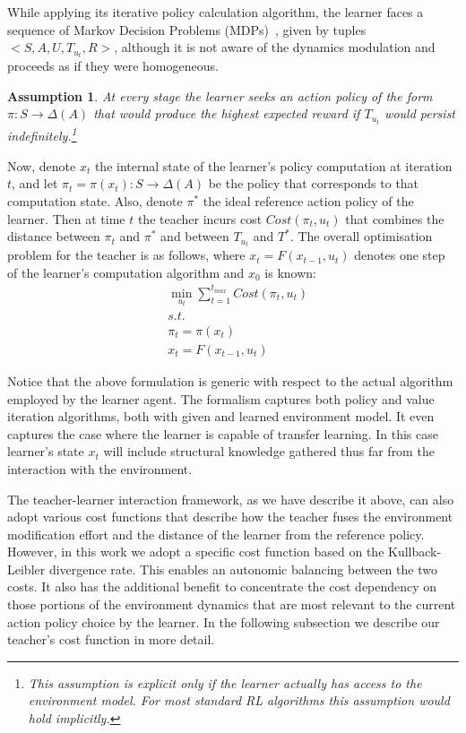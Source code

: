 \documentclass[letterpaper]{aamas2010}
\newtheorem{assume}{{\bf Assumption}}
\begin{document}
While applying its iterative policy calculation algorithm, the learner
faces a sequence of Markov Decision Problems (MDPs)~\cite{puterman_book_94},
 given by tuples $<S,A,U,T_{u_t},R>$, although it is not aware of the dynamics
modulation and proceeds as if they were homogeneous. 
\begin{assume}\label{assume_persistence}
At every
stage the learner seeks an action policy of the form
$\pi:S\rightarrow\Delta(A)$ that would produce the highest expected
reward if $T_{u_t}$ would persist indefinitely.\footnote{This 
  assumption is explicit only if the learner actually has access to
  the environment model. For most standard RL algorithms this
  assumption would hold implicitly.}
\end{assume}

Now, denote $x_t$ the internal state of the learner's policy
computation at iteration $t$, and let
$\pi_t=\pi(x_t):S\rightarrow\Delta(A)$ be the policy that corresponds
to that computation state. Also, denote $\pi^*$ the ideal reference
action policy of the learner. Then at time $t$ the teacher incurs cost
$Cost(\pi_t,u_t)$ that combines the distance between $\pi_t$ and
$\pi^*$ and between $T_{u_t}$ and $T^*$. The overall optimisation
problem for the teacher is as follows, where $x_t=F(x_{t-1},u_t)$
denotes one step of the learner's computation algorithm and $x_0$ is
known:
\begin{eqnarray*}
&\min\limits_{u_t}\sum\limits_{t=1}^{t_{max}}Cost(\pi_t,u_t)\\
&s.t.\\
&\pi_t=\pi(x_t)\\
&x_t=F(x_{t-1},u_t)
\end{eqnarray*}

Notice that the above formulation is generic with respect to the
actual algorithm employed by the learner agent. The formalism captures
both policy and value iteration algorithms, both with given and
learned environment model. It even captures the case where the learner
is capable of transfer learning. In this case learner's state $x_t$
will include structural knowledge gathered thus far from the
interaction with the environment. 

The teacher-learner interaction framework, as we have describe it
above, can also adopt various cost functions that describe how the
teacher fuses the environment modification effort and the distance of
the learner from the reference policy. However, in this work we adopt
a specific cost function based on the Kullback-Leibler divergence
rate. This enables an autonomic balancing between the two costs. It also
has the additional benefit to concentrate the cost dependency on those
portions of the environment dynamics that are most relevant to the
current action policy choice by the learner. In the following
subsection we describe our teacher's cost function in more detail.
\end{document}
